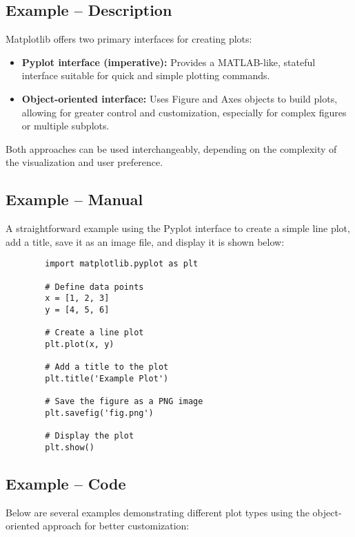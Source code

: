 \subsection{Example -- Description}
Matplotlib offers two primary interfaces for creating plots:

\begin{itemize}
	\item \textbf{Pyplot interface (imperative):} Provides a MATLAB-like, stateful interface suitable for quick and simple plotting commands.
	\item \textbf{Object-oriented interface:} Uses Figure and Axes objects to build plots, allowing for greater control and customization, especially for complex figures or multiple subplots.
\end{itemize}

Both approaches can be used interchangeably, depending on the complexity of the visualization and user preference.

\subsection{Example -- Manual}
A straightforward example using the Pyplot interface to create a simple line plot, add a title, save it as an image file, and display it is shown below:

\begin{framed}
	\begin{verbatim}
		import matplotlib.pyplot as plt
		
		# Define data points
		x = [1, 2, 3]
		y = [4, 5, 6]
		
		# Create a line plot
		plt.plot(x, y)
		
		# Add a title to the plot
		plt.title('Example Plot')
		
		# Save the figure as a PNG image
		plt.savefig('fig.png')
		
		# Display the plot
		plt.show()
	\end{verbatim}
\end{framed}

\subsection{Example -- Code}
Below are several examples demonstrating different plot types using the object-oriented approach for better customization:

